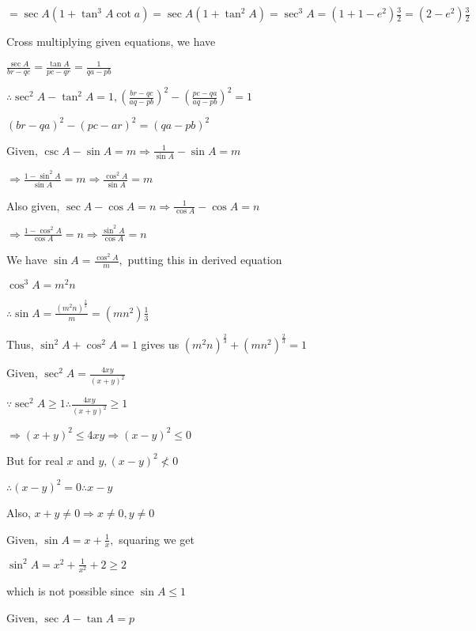     $=\sec A(1 + \tan^3A\cot a) = \sec A(1 + \tan^2A) = \sec^3A = (1 + 1 - e^2)\frac{3}{2} = (2 - e^2)\frac{3}{2}$

\item Cross multiplying given equations, we have

    $\frac{\sec A}{br - qc} = \frac{\tan A}{pc - qr} = \frac{1}{qa - pb}$

    $\therefore \sec^2A - \tan^2A = 1, \left(\frac{br - qc}{aq - pb}\right)^2 - \left(\frac{pc - qa}{aq - pb}\right)^2 = 1$

    $(br - qa)^2 - (pc - ar)^2 = (qa - pb)^2$

\item Given, $\csc A - \sin A = m \Rightarrow \frac{1}{\sin A } - \sin A = m$

    $\Rightarrow \frac{1 - \sin^2A}{\sin A} = m \Rightarrow \frac{\cos^2A}{\sin A} = m$

    Also given, $\sec A - \cos A = n \Rightarrow \frac{1}{\cos A} - \cos A = n$

    $\Rightarrow \frac{1 - \cos^2A}{\cos A} = n \Rightarrow \frac{\sin^2A}{\cos A} = n$

    We have $\sin A = \frac{\cos^2A}{m},$ putting this in derived equation

    $\cos^3A = m^2n$

    $\therefore \sin A = \frac{(m^2n)^{\frac{2}{3}}}{m} = (mn^2)\frac{1}{3}$

    Thus, $\sin^2A + \cos^2A = 1$ gives us $(m^2n)^{\frac{2}{3}} + (mn^2)^{\frac{2}{3}} = 1$

\item Given, $\sec^2A = \frac{4xy}{(x + y)^2}$

    $\because \sec^2A \geq 1 \therefore \frac{4xy}{(x + y)^2}\geq 1$

    $\Rightarrow (x + y)^2 \leq 4xy \Rightarrow (x - y)^2 \leq 0$

    But for real $x$ and $y, (x - y)^2\nless 0$

    $\therefore (x - y)^2 = 0 \therefore x - y$

    Also, $x + y \neq 0 \Rightarrow x\neq 0, y \neq 0$

\item Given, $\sin A = x + \frac{1}{x},$ squaring we get

    $\sin^2A = x^2 + \frac{1}{x^2} + 2 \geq 2$

    which is not possible since $\sin A \leq 1$

\item Given, $\sec A - \tan A = p$

